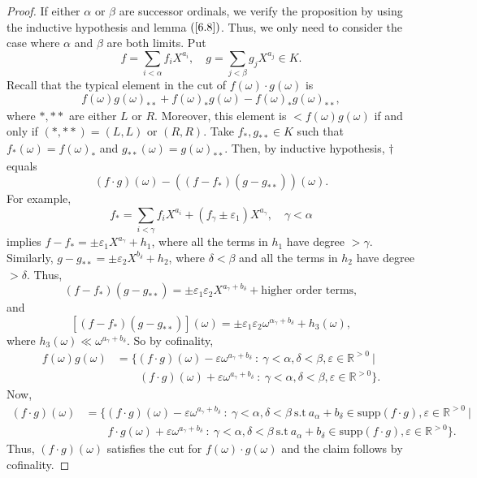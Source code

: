 \begin{proof} If either $\alpha$ or $\beta$ are successor ordinals, we verify the proposition by using the inductive hypothesis and lemma $(\ref{6.8})$.  Thus, we only need to consider the case where $\alpha$ and $\beta$ are both limits.  Put 
$$f=\sum_{i<\alpha}f_i X^{a_i}, \quad g=\sum_{j<\beta}g_jX^{a_j}\in K.$$
Recall that the typical element in the cut of $f(\omega)\cdot g(\omega)$ is 
\begin{equation} f(\omega)g(\omega)_{**} + f(\omega)_{*}g(\omega)-f(\omega)_*g(\omega)_{**}, \tag{$\dagger$} \end{equation}
where $*, **$ are either $L$ or $R$.  Moreover, this element is $<f(\omega)g(\omega)$ if and only if $(*, **)=(L, L)$ or $(R, R)$.  Take $f_*, g_{**}\in K$ such that $f_*(\omega)= f(\omega)_*$ and $g_{**}(\omega)=g(\omega)_{**}$.  Then, by inductive hypothesis, $\dagger$ equals
$$(f\cdot g)(\omega) -((f-f_*)(g-g_{**}))(\omega).$$
For example, 
$$f_*=\sum_{i<\gamma}f_iX^{a_i} + (f_\gamma\pm \varepsilon_1)X^{a_\gamma}, \quad \gamma<\alpha$$
implies $f-f_*= \pm \varepsilon_1X^{a_\gamma}+h_1$, where all the terms in $h_1$ have degree $>\gamma$. Similarly, $g-g_{**}= \pm \varepsilon_2X^{b_\delta} + h_2$, where $\delta <\beta$ and all the terms in $h_2$ have degree $>\delta$.  Thus,
$$(f-f_*)(g-g_{**})= \pm \varepsilon_1\varepsilon_2 X^{a_\gamma + b_\delta} + \text{higher order terms},$$
and
$$[(f-f_*)(g-g_{**})](\omega) = \pm \varepsilon_1\varepsilon_2\omega^{\alpha_\gamma+b_\delta} + h_3(\omega),$$
where $h_3(\omega)\ll\omega^{a_\gamma+b_\delta}$.  So by cofinality,
\begin{align*}f(\omega)g(\omega) &=\{ (f\cdot g)(\omega)-\varepsilon\omega^{a_\gamma+b_\delta} \ : \ \gamma<\alpha, \delta < \beta, \varepsilon\in \mathds{R}^{>0} \ | \\  
 &\qquad (f\cdot g)(\omega)+\varepsilon\omega^{a_\gamma+b_\delta} \ : \ \gamma<\alpha, \delta < \beta, \varepsilon\in \mathds{R}^{>0} \}. \end{align*}
 Now,
\begin{align*}(f\cdot g)(\omega) &=\{ (f\cdot g)(\omega)-\varepsilon\omega^{a_\gamma+b_\delta} \ : \ \gamma<\alpha, \delta < \beta \ \text{s.t} \ a_\alpha+b_\delta \in \text{supp}(f\cdot g), \varepsilon\in \mathds{R}^{>0} \ | \\  
 &\qquad f\cdot g(\omega)+\varepsilon\omega^{a_\gamma+b_\delta} \ : \ \gamma<\alpha, \delta < \beta \ \text{s.t} \ a_\alpha+b_\delta \in \text{supp}(f\cdot g),\varepsilon\in \mathds{R}^{>0} \}. \end{align*}
Thus, $(f\cdot g)(\omega)$ satisfies the cut for $f(\omega)\cdot g(\omega)$ and the claim follows by cofinality.  

\end{proof}

